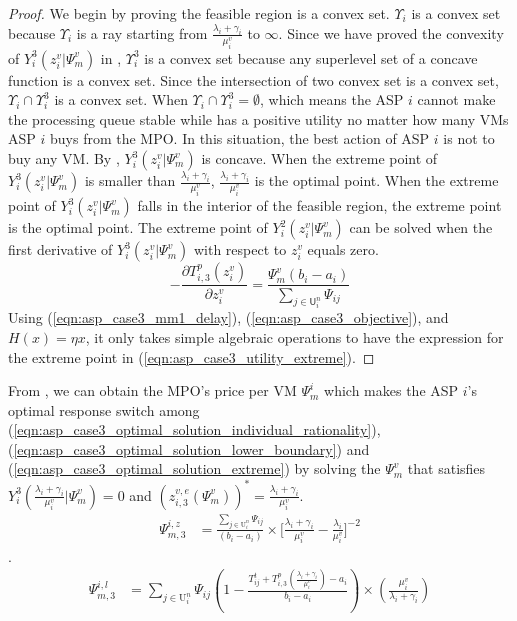 \documentclass[conference]{IEEEtran}
\begin{document}
\begin{proof}
We begin by proving the feasible region is a convex set. $\Upsilon_i$ is a convex set because $\Upsilon_i$ is a ray starting from $\frac{\lambda_i+\gamma_i}{\mu_i^v}$ to $\infty$. Since we have proved the convexity of $Y_i^3(z_i^v|\Psi_m^v)$ in , $\Upsilon_i^3$ is a convex set because any superlevel set of a concave function is a convex set. Since the intersection of two convex set is a convex set, $\Upsilon_i \cap \Upsilon_i^3$ is a convex set. When $\Upsilon_i \cap \Upsilon_i^3 = \emptyset$, which means the ASP $i$ cannot make the processing queue stable while has a positive utility no matter how many VMs ASP $i$ buys from the MPO. In this situation, the best action of ASP $i$ is not to buy any VM. By , $Y_i^3(z_i^v|\Psi_m^v)$ is concave. When the extreme point of $Y_i^3(z_i^v|\Psi_m^v)$ is smaller than $\frac{\lambda_i+\gamma_i}{\mu_i^v}$, $\frac{\lambda_i+\gamma_i}{\mu_i^v}$ is the optimal point. When the extreme point of $Y_i^3(z_i^v|\Psi_m^v)$ falls in the interior of the feasible region, the extreme point is the optimal point. The extreme point of $Y_i^2(z_i^v|\Psi_m^v)$ can be solved when the first derivative of $Y_i^3(z_i^v|\Psi_m^v)$ with respect to $z_i^v$ equals zero.
\begin{equation} \label{eqn:asp_case3_utility_first_deriv}
-\frac{\partial T_{i,3}^p(z_i^v)}{\partial z_i^v} = \frac{\Psi_m^v (b_i - a_i)}{\sum_{j \in \mathsf{U}_i^n} \Psi_{ij}}
\end{equation}
Using (\ref{eqn:asp_case3_mm1_delay}), (\ref{eqn:asp_case3_objective}), and $H(x)=\eta x $, it only takes simple algebraic operations to have the expression for the extreme point in (\ref{eqn:asp_case3_utility_extreme}). \qedhere
\end{proof}

From , we can obtain the MPO's price per VM $\Psi_m^i$ which makes the ASP $i$'s optimal response switch among (\ref{eqn:asp_case3_optimal_solution_individual_rationality}), (\ref{eqn:asp_case3_optimal_solution_lower_boundary}) and (\ref{eqn:asp_case3_optimal_solution_extreme}) by solving the $\Psi_m^v$ that satisfies $Y_i^3(\frac{\lambda_i+\gamma_i}{\mu_i^v}|\Psi_m^v) = 0$ and $(z_{i,3}^{v,e}(\Psi_m^v))^* = \frac{\lambda_i+\gamma_i}{\mu_i^v}$.
\begin{equation}
\begin{aligned}
\Psi_{m,3}^{i,z}&= \frac{\sum_{j \in \mathrm{U}_i^n}\Psi_{ij}}{(b_i-a_i)}\times \big[\frac{\lambda_i+\gamma_i}{\mu_i^v} - \frac{\lambda_i}{\mu_i^v}\big]^{-2}
\end{aligned}
\end{equation}.
\begin{equation}
\begin{aligned}
\Psi_{m,3}^{i,l}&= \sum_{j \in \mathrm{U}_i^n}\Psi_{ij}(1-\frac{T_{ij}^t + T_{i,3}^p(\frac{\lambda_i+\gamma_i}{\mu_i^v})-a_i}{b_i-a_i})\times(\frac{\mu_i^v}{\lambda_i+\gamma_i})
\end{aligned}
\end{equation}
\end{document}

